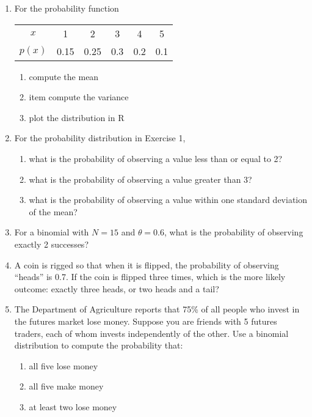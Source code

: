 \documentclass[10pt]{article}
\begin{document}
\begin{enumerate}
\item For the probability function

\begin{center}
  \begin{tabular}{cccccc}
    \hline
$x$ & 1 & 2 & 3 & 4 & 5\\
    $p(x)$ & 0.15 & 0.25 & 0.3 & 0.2 & 0.1\\
    \hline
\end{tabular}
\end{center}

\begin{enumerate}
\item compute the mean
\item item compute the variance
\item plot the distribution in R
\end{enumerate}


\item For the probability distribution in Exercise 1,

  \begin{enumerate}
\item what is the probability of observing a value less than or equal to 2?
\item what is the probability of observing a value greater than 3?
\item what is the probability of observing a value within one standard deviation of the mean?
\end{enumerate}


\item For a binomial with $N=15$ and $\theta = 0.6$, what is the probability of observing exactly 2 successes?

\item A coin is rigged so that when it is flipped, the probability of observing ``heads'' is 0.7.  If the coin is flipped three times, which is the more likely outcome: exactly three heads, or two heads and a tail?

\item The Department of Agriculture reports that 75\% of all people who invest in the futures market lose money.  Suppose you are friends with 5 futures traders, each of whom invests independently of the other.  Use a binomial distribution to compute the probability that:
\begin{enumerate}
\item all five lose money
\item all five make money
  \item at least two lose money
\end{enumerate}



\end{enumerate}
\end{document}
